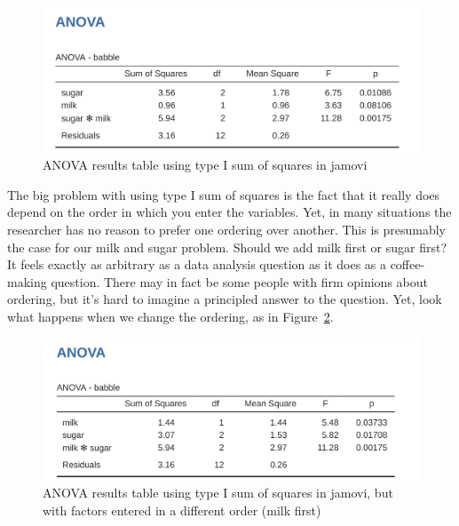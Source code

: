 \documentclass[
  a4paper,
]{book}
\begin{document}
\begin{figure}

\includegraphics[width=1\textwidth,height=\textheight]{images/fig14-27.png} \hfill{}

\caption{\label{fig-fig14-27}ANOVA results table using type I sum of
squares in jamovi}

\end{figure}

The big problem with using type I sum of squares is the fact that it
really does depend on the order in which you enter the variables. Yet,
in many situations the researcher has no reason to prefer one ordering
over another. This is presumably the case for our milk and sugar
problem. Should we add milk first or sugar first? It feels exactly as
arbitrary as a data analysis question as it does as a coffee-making
question. There may in fact be some people with firm opinions about
ordering, but it's hard to imagine a principled answer to the question.
Yet, look what happens when we change the ordering, as in
Figure~\ref{fig-fig14-28}.

\begin{figure}

\includegraphics[width=1\textwidth,height=\textheight]{images/fig14-28.png} \hfill{}

\caption{\label{fig-fig14-28}ANOVA results table using type I sum of
squares in jamovi, but with factors entered in a different order (milk
first)}

\end{figure}
\end{document}
